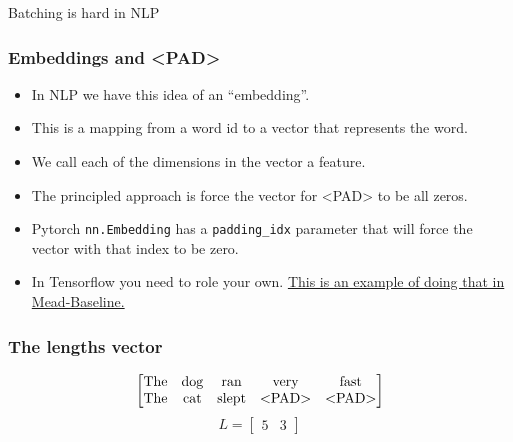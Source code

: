 \documentclass{beamer}
\begin{document}
\begin{section}{Batching is hard in NLP}
    \begin{frame}
        \frametitle{Embeddings and \textless PAD\textgreater}
        \begin{itemize}
            \item In NLP we have this idea of an ``embedding''.
            \item This is a mapping from a word id to a vector that represents the word.
            \item We call each of the dimensions in the vector a feature.
            \item The principled approach is force the vector for \textless PAD\textgreater \hspace{1pt} to be all
                zeros.
            \item Pytorch \texttt{nn.Embedding} has a \texttt{padding\_idx} parameter that will force the vector with
                    that index to be zero.
            \item In Tensorflow you need to role your own.
                \href{https://github.com/dpressel/mead-baseline/blob/f98e64afcbab8a267fce5d13a434a981aa564d27/python/baseline/tf/tfy.py\#L656}{This
                is an example of doing that in Mead-Baseline.}
        \end{itemize}
    \end{frame}

    \begin{frame}
        \frametitle{The lengths vector}

        $$
            \begin{bmatrix}
                \text{The} & \text{dog} & \text{ran} & \text{very} & \text{fast} \\
                \text{The} & \text{cat} & \text{slept} & \text{\textless PAD\textgreater} & \text{\textless PAD\textgreater}
            \end{bmatrix}
        $$
        $$
            L = \begin{bmatrix} 5 & 3 \end{bmatrix}
        $$


\end{frame}
\end{section}
\end{document}
